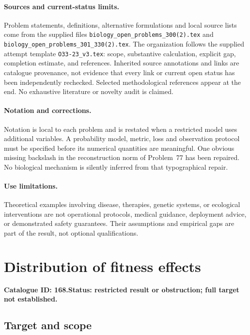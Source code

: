 \documentclass[11pt]{article}
\begin{document}
\paragraph{Sources and current-status limits.}
Problem statements, definitions, alternative formulations and local source lists
come from the supplied files
\texttt{biology\_open\_problems\_300(2).tex} and
\texttt{biology\_open\_problems\_301\_330(2).tex}.
The organization follows the supplied attempt template
\texttt{O33-23\_v3.tex}: scope, substantive calculation, explicit gap,
completion estimate, and references. Inherited source annotations and links are
catalogue provenance, not evidence that every link or current open status has
been independently rechecked. Selected methodological references appear at the
end. No exhaustive literature or novelty audit is claimed.

\paragraph{Notation and corrections.}
Notation is local to each problem and is restated when a restricted model uses
additional variables. A probability model, metric, loss and observation protocol
must be specified before its numerical quantities are meaningful. One obvious
missing backslash in the reconstruction norm of Problem~77 has been repaired.
No biological mechanism is silently inferred from that typographical repair.

\paragraph{Use limitations.}
Theoretical examples involving disease, therapies, genetic systems, or ecological
interventions are not operational protocols, medical guidance, deployment advice,
or demonstrated safety guarantees. Their assumptions and empirical gaps are part
of the result, not optional qualifications.

\setcounter{section}{167}
\section{Distribution of fitness effects}
\label{prob:168}
\noindent\textbf{Catalogue ID: 168.}\quad \textbf{Status: restricted result or obstruction; full target not established.}
\subsection{Target and scope}
\end{document}
